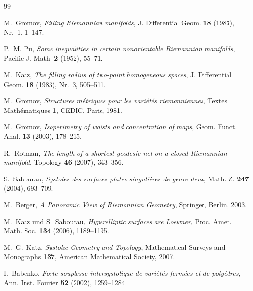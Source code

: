 \documentclass[12pt,a4paper]{amsart}
\theoremstyle{definition}
\theoremstyle{remark}
\begin{document}
\begin{thebibliography}{99}

M.~Gromov,
\textit{Filling Riemannian manifolds},
J. Differential Geom. \textbf{18} (1983), Nr.~1, 1--147.

P.~M. Pu,
\textit{Some inequalities in certain nonorientable Riemannian manifolds},
Pacific J. Math. \textbf{2} (1952), 55--71.

M.~Katz,
\textit{The filling radius of two-point homogeneous spaces},
J. Differential Geom. \textbf{18} (1983), Nr.~3, 505--511.

M.~Gromov,
\textit{Structures métriques pour les variétés riemanniennes},
Textes Mathématiques \textbf{1}, CEDIC, Paris, 1981.

M.~Gromov,
\textit{Isoperimetry of waists and concentration of maps},
Geom. Funct. Anal. \textbf{13} (2003), 178--215.

R.~Rotman,
\textit{The length of a shortest geodesic net on a closed Riemannian manifold},
Topology \textbf{46} (2007), 343--356.

S.~Sabourau,
\textit{Systoles des surfaces plates singulières de genre deux},
Math. Z. \textbf{247} (2004), 693--709.

M.~Berger,
\textit{A Panoramic View of Riemannian Geometry},
Springer, Berlin, 2003.

M.~Katz und S.~Sabourau,
\textit{Hyperelliptic surfaces are Loewner},
Proc. Amer. Math. Soc. \textbf{134} (2006), 1189--1195.

M.~G.~Katz,
\textit{Systolic Geometry and Topology},
Mathematical Surveys and Monographs \textbf{137},
American Mathematical Society, 2007.

I.~Babenko,
\textit{Forte souplesse intersystolique de variétés fermées et de polyèdres},
Ann. Inst. Fourier \textbf{52} (2002), 1259--1284.

\end{thebibliography}
\end{document}
